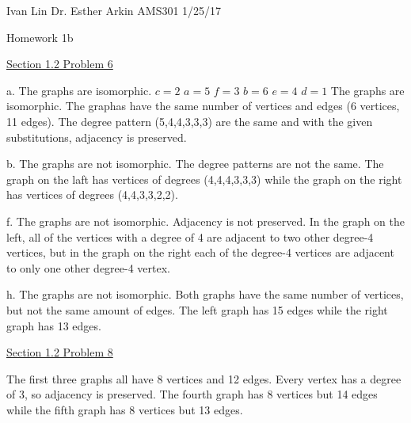 \documentclass{article}
\begin{document}
Ivan Lin\newline{}
Dr. Esther Arkin\newline{}
AMS301\newline{}
1/25/17

\begin{center}
  Homework 1b
\end{center}

\underline{Section 1.2 Problem 6}

a. The graphs are isomorphic.\newline{}
$c=2$\newline{}
$a=5$\newline{}
$f=3$\newline{}
$b=6$\newline{}
$e=4$\newline{}
$d=1$\newline{}
The graphs are isomorphic. The graphas have the same number of vertices and edges (6 vertices, 11 edges). The degree pattern (5,4,4,3,3,3) are the same and with the given substitutions, adjacency is preserved.\newline{}\newline{}

b. The graphs are not isomorphic.\newline{}
The degree patterns are not the same. The graph on the laft has vertices of degrees (4,4,4,3,3,3) while the graph on the right has vertices of degrees (4,4,3,3,2,2).\newline{}

f. The graphs are not isomorphic.\newline{}
Adjacency is not preserved. In the graph on the left, all of the vertices with a degree of 4 are adjacent to two other degree-4 vertices, but in the graph on the right each of the degree-4 vertices are adjacent to only one other degree-4 vertex.\newline{}

h. The graphs are not isomorphic.\newline{}
Both graphs have the same number of vertices, but not the same amount of edges. The left graph has 15 edges while the right graph has 13 edges.\newline{}\newline{}

\underline{Section 1.2 Problem 8}

The first three graphs all have 8 vertices and 12 edges. Every vertex has a degree of 3, so adjacency is preserved. The fourth graph has 8 vertices but 14 edges while the fifth graph has 8 vertices but 13 edges.\newline{}
\end{document}
